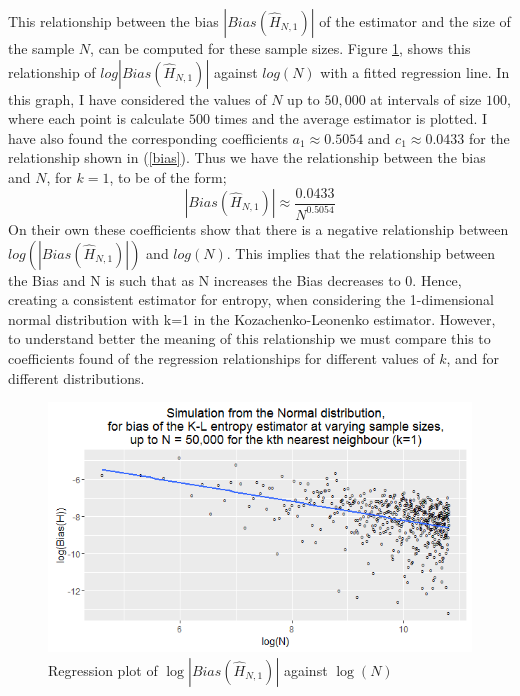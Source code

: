 \documentclass{report}
\begin{document}
This relationship between the bias $|Bias(\hat{H}_{N, 1})|$ of the estimator and the size of the sample $N$, can be computed for these sample sizes. Figure \ref{normal_k=1_graph}, shows this relationship of $log|Bias(\hat{H}_{N, 1})|$ against $log(N)$ with a fitted regression line. In this graph, I have considered the values of $N$ up to $50,000$ at intervals of size $100$, where each point is calculate $500$ times and the average estimator is plotted. I have also found the corresponding coefficients $a_{1} \approx 0.5054$ and $c_{1} \approx 0.0433$ for the relationship shown in (\ref{bias}). Thus we have the relationship between the bias and $N$, for $k=1$, to be of the form;
\begin{equation}
|Bias(\hat{H}_{N, 1})| \approx \frac{0.0433}{N^{0.5054}} \nonumber
\end{equation}
On their own these coefficients show that there is a negative relationship between $log(|Bias(\hat{H}_{N, 1})|)$ and $log(N)$. This implies that the relationship between the Bias and N is such that as N increases the Bias decreases to 0. Hence, creating a consistent estimator for entropy, when considering the 1-dimensional normal distribution with k=1 in the Kozachenko-Leonenko estimator. However, to understand better the meaning of this relationship we must compare this to coefficients found of the regression relationships for different values of $k$, and for different distributions.

\begin{figure}
  \begin{center}
    \includegraphics[width=\textwidth]{./Graphs/new_normal_k=1.png}
  \end{center}
\caption{Regression plot of $\log|Bias(\hat{H}_{N, 1})|$ against $\log(N)$}
  \label{normal_k=1_graph}
\end{figure}
\end{document}
